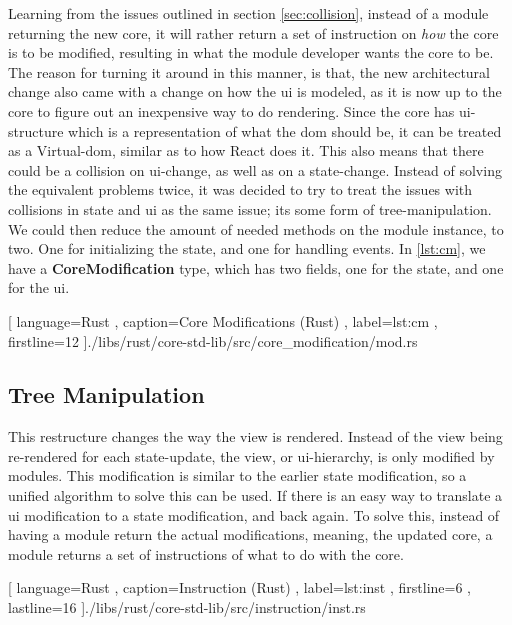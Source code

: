 Learning from the issues outlined in section \ref{sec:collision}, instead of a
module returning the new core, it will rather return a set of instruction on
\textit{how} the core is to be modified, resulting in what the module developer
wants the core to be. The reason for turning it around in this manner, is that,
the new architectural change also came with a change on how the \gls*{ui} is
modeled, as it is now up to the core to figure out an inexpensive way to do
rendering. Since the core has \gls*{ui}-structure which is a representation of
what the \gls*{dom} should be, it can be treated as a Virtual-\gls*{dom}, similar
as to how React does it. This also means that there could be a collision on
\gls*{ui}-change, as well as on a state-change. Instead of solving the equivalent
problems twice, it was decided to try to treat the issues with collisions in
state and \gls*{ui} as the same issue; its some form of tree-manipulation. We
could then reduce the amount of needed methods on the module instance, to two.
One for initializing the state, and one for handling events. In \ref{lst:cm},
we have a \textbf{CoreModification} type, which has two fields, one for the
state, and one for the \gls*{ui}.

\begin{center}
  
    [ language=Rust
    , caption={Core Modifications (Rust)}
    , label=lst:cm
    , firstline=12
    ]{./libs/rust/core-std-lib/src/core_modification/mod.rs}
\end{center}

\subsection{Tree Manipulation}

This restructure changes the way the view is rendered. Instead of the view being
re-rendered for each state-update, the view, or \gls*{ui}-hierarchy, is only
modified by modules. This modification is similar to the earlier state
modification, so a unified algorithm to solve this can be used. If there is an
easy way to translate a \gls*{ui} modification to a state modification, and back
again. To solve this, instead of having a module return the actual
modifications, meaning, the updated core, a module returns a set of instructions
of what to do with the core.

\begin{code}[H]
  
   [ language=Rust
   , caption={Instruction (Rust)}
   , label=lst:inst
   , firstline=6
   , lastline=16
   ]{./libs/rust/core-std-lib/src/instruction/inst.rs}
\end{code}

